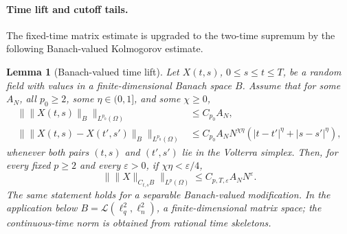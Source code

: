 \documentclass[11pt,reqno]{amsart}
\numberwithin{equation}{section}
\theoremstyle{plain}
\newtheorem{lemma}[theorem]{Lemma}
\theoremstyle{definition}
\newcommand{\cL}{\mathcal L}
\newcommand{\eps}{\varepsilon}
\begin{document}
\paragraph{Time lift and cutoff tails.}
The fixed-time matrix estimate is upgraded to the two-time supremum by the
following Banach-valued Kolmogorov estimate.

\begin{lemma}[Banach-valued time lift]\label{lem:time-lift}
Let \(X(t,s)\), \(0\le s\le t\le T\), be a random field with values in a finite-dimensional Banach space \(B\).  Assume that for some \(A_N\), all \(p_0\ge2\), some \(\eta\in(0,1]\), and some \(\chi\ge0\),
\begin{align}
        \|\|X(t,s)\|_B\|_{L^{p_0}(\Omega)}&\le C_{p_0}A_N,\label{eq:time-lift-hyp-0}\\
        \|\|X(t,s)-X(t',s')\|_B\|_{L^{p_0}(\Omega)}
        &\le C_{p_0}A_NN^{\chi\eta}
        (|t-t'|^\eta+|s-s'|^\eta),\label{eq:time-lift-hyp-1}
\end{align}
whenever both pairs \((t,s)\) and \((t',s')\) lie in the Volterra simplex.  Then, for every fixed \(p\ge2\) and every \(\eps>0\), if \(\chi\eta<\eps/4\),
\begin{equation}\label{eq:abstract-time-lift}
        \|\|X\|_{C_{t,s}B}\|_{L^p(\Omega)}
        \le C_{p,T,\eps}A_NN^\eps .
\end{equation}
The same statement holds for a separable Banach-valued modification.  In the application below \(B=\cL(\ell_q^2,\ell_n^2)\), a finite-dimensional matrix space; the continuous-time norm is obtained from rational time skeletons.
\end{lemma}
\end{document}
